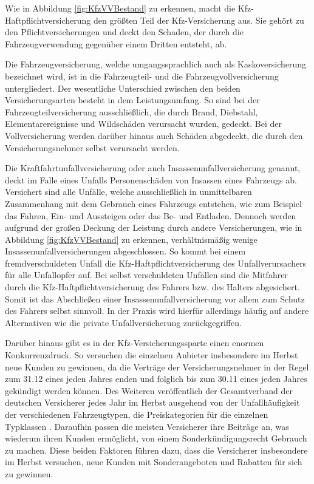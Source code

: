 Wie in Abbildung \vref{fig:KfzVVBestand} zu erkennen, macht die Kfz-Haftpflichtversicherung den größten Teil der Kfz-Versicherung aus. Sie gehört zu den Pflichtversicherungen und deckt den Schaden, der durch die Fahrzeugverwendung gegenüber einem Dritten entsteht, ab. \autocite[Vgl.][S. 81]{STADLER2008}

Die Fahrzeugversicherung, welche umgangssprachlich auch als Kaskoversicherung bezeichnet wird, ist in die Fahrzeugteil- und die Fahrzeugvollversicherung untergliedert. Der wesentliche Unterschied zwischen den beiden Versicherungsarten besteht in dem Leistungsumfang. So sind bei der Fahrzeugteilversicherung ausschließlich, die durch Brand, Diebstahl, Elementarereignisse und Wildschäden verursacht wurden, gedeckt. Bei der Vollversicherung werden darüber hinaus auch Schäden abgedeckt, die durch den Versicherungsnehmer selbst verursacht werden.\autocite[Vgl.][S. 48]{FELTEN2012}

Die Kraftfahrtunfallversicherung oder auch Insassenunfallversicherung genannt, deckt im Falle eines Unfalls Personenschäden von Insassen eines Fahrzeugs ab. Versichert sind alle Unfälle, welche ausschließlich in unmittelbaren Zusammenhang mit dem Gebrauch eines Fahrzeugs entstehen, wie zum Beispiel das Fahren, Ein- und Aussteigen oder das Be- und Entladen.\autocite[Vgl.][S. 6f]{STADLER1998} Dennoch werden aufgrund der großen Deckung der Leistung durch andere Versicherungen, wie in Abbildung \vref{fig:KfzVVBestand} zu erkennen, verhältnismäßig wenige Insassenunfallversicherungen abgeschlossen. So kommt bei einem fremdverschuldeten Unfall die Kfz-Haftpflichtversicherung des Unfallverursachers für alle Unfallopfer auf. Bei selbst verschuldeten Unfällen sind die Mitfahrer durch die Kfz-Haftpflichtversicherung des Fahrers bzw. des Halters abgesichert. Somit ist das Abschließen einer Insassenunfallversicherung vor allem zum Schutz des Fahrers selbst sinnvoll.\autocite[Vgl.][S. 173f]{LAMMERS2006} In der Praxis wird hierfür allerdings häufig auf andere Alternativen wie die private Unfallversicherung zurückgegriffen.\autocite[Vgl.][]{GRATZLA2018}  

Darüber hinaus gibt es in der Kfz-Versicherungssparte einen enormen Konkurrenzdruck. So versuchen die einzelnen Anbieter insbesondere im Herbst neue Kunden zu gewinnen, da die Verträge der Versicherungsnehmer in der Regel zum 31.12 eines jeden Jahres enden und folglich bis zum 30.11 eines jeden Jahres gekündigt werden können.\autocite[Vgl.][]{WARENTEST2022} Des Weiteren veröffentlich der Gesamtverband der deutschen Versicherer jedes Jahr im Herbst ausgehend von der Unfallhäufigkeit der verschiedenen Fahrzeugtypen, die Preiskategorien für die einzelnen Typklassen . Daraufhin passen die meisten Versicherer ihre Beiträge an, was wiederum ihren Kunden ermöglicht, von einem Sonderkündigungsrecht Gebrauch zu machen.\autocite[Vgl.][]{NUS2022} Diese beiden Faktoren führen dazu, dass die Versicherer insbesondere im Herbst versuchen, neue Kunden mit Sonderangeboten und Rabatten für sich zu gewinnen. 

